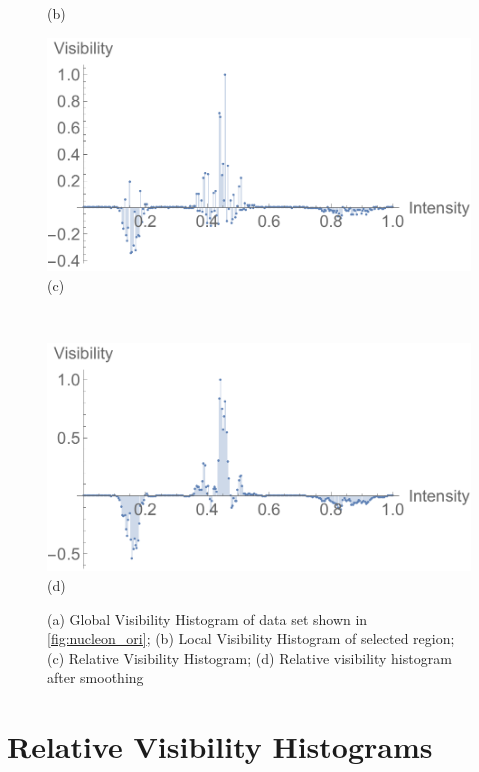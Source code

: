 \documentclass[twoside,twocolumn,10pt]{article}
\begin{document}
\begin{figure}
\begin{minipage}{.245\textwidth}
		(b)%
		\label{fig:local_visibility_histogram}
	\end{minipage}
	\begin{minipage}{.245\textwidth}
		\centering
		\includegraphics[width=1\linewidth]{relative_visibility_histogram}
		(c) %
		\label{fig:relative_visibility_histogram}
	\end{minipage}~
	\begin{minipage}{.245\textwidth}
		\centering
		\includegraphics[width=1\linewidth]{relative_visibility_histogram_with_gaussian}
		(d) %
		\label{fig:relative_visibility_histogram_with_gaussian}
	\end{minipage}
	\caption{(a) Global Visibility Histogram of data set shown in \autoref{fig:nucleon_ori}; (b) Local Visibility Histogram of selected region; (c) Relative Visibility Histogram; (d) Relative visibility histogram after smoothing}
	\label{fig:nucleon_hist}
\end{figure}

\section{Relative Visibility Histograms}
\end{document}
